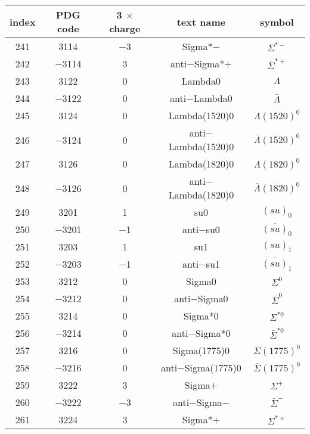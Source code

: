 \documentclass{article}
\begin{document}
\clearpage

\begin{table}[!htbp]
\centering
\begin{tabular}{|c|c|c|c|c|}
\hline
index & PDG code & 3 $\times$ charge & text name & symbol \\
\hline
241 & 3114 & $-$3 & Sigma*$-$ & $\Sigma^{*-}$ \\
\hline
242 & $-$3114 & 3 & anti$-$Sigma*$+$ & $\bar{\Sigma}^{*+}$ \\
\hline
243 & 3122 & 0 & Lambda0 & $\Lambda$ \\
\hline
244 & $-$3122 & 0 & anti$-$Lambda0 & $\bar{\Lambda}$ \\
\hline
245 & 3124 & 0 & Lambda(1520)0 & $\Lambda(1520)^{0}$ \\
\hline
246 & $-$3124 & 0 & anti$-$Lambda(1520)0 & $\bar{\Lambda}(1520)^{0}$ \\
\hline
247 & 3126 & 0 & Lambda(1820)0 & $\Lambda(1820)^{0}$ \\
\hline
248 & $-$3126 & 0 & anti$-$Lambda(1820)0 & $\bar{\Lambda}(1820)^{0}$ \\
\hline
249 & 3201 & 1 & su\underline{\hspace{0.6em}}0 & $(su)_0$ \\
\hline
250 & $-$3201 & $-$1 & anti$-$su\underline{\hspace{0.6em}}0 & $\bar{(su)}_0$ \\
\hline
251 & 3203 & 1 & su\underline{\hspace{0.6em}}1 & $(su)_{1}$ \\
\hline
252 & $-$3203 & $-$1 & anti$-$su\underline{\hspace{0.6em}}1 & $\bar{(su)}_{1}$ \\
\hline
253 & 3212 & 0 & Sigma0 & $\Sigma^{0}$ \\
\hline
254 & $-$3212 & 0 & anti$-$Sigma0 & $\bar{\Sigma}^{0}$ \\
\hline
255 & 3214 & 0 & Sigma*0 & $\Sigma^{*0}$ \\
\hline
256 & $-$3214 & 0 & anti$-$Sigma*0 & $\bar{\Sigma}^{*0}$ \\
\hline
257 & 3216 & 0 & Sigma(1775)0 & $\Sigma(1775)^{0}$ \\
\hline
258 & $-$3216 & 0 & anti$-$Sigma(1775)0 & $\bar{\Sigma}(1775)^{0}$ \\
\hline
259 & 3222 & 3 & Sigma$+$ & $\Sigma^{+}$ \\
\hline
260 & $-$3222 & $-$3 & anti$-$Sigma$-$ & $\bar{\Sigma}^{-}$ \\
\hline
261 & 3224 & 3 & Sigma*$+$ & $\Sigma^{*+}$ \\

\end{tabular}
\end{table}
\end{document}
